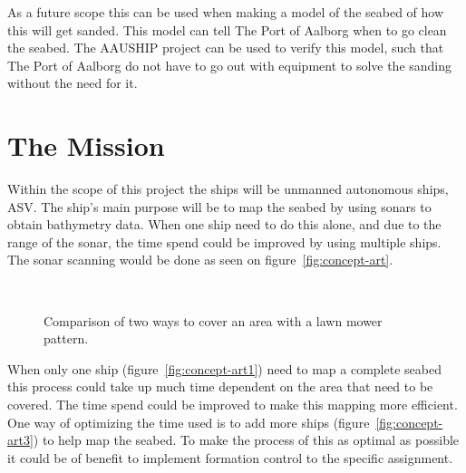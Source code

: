 As a future scope this can be used when making a model of the seabed of how this will get sanded. This model can tell The Port of Aalborg when to go clean the seabed. The AAUSHIP project can be used to verify this model, such that The Port of Aalborg do not have to go out with equipment to solve the sanding without the need for it.

\section{The Mission}
\label{sc:mission}
Within the scope of this project the ships will be unmanned autonomous ships,
\ac{ASV}. The ship's main purpose will be to map the seabed by using
sonars to obtain bathymetry data. When one ship need to do this alone, and due to the range of
the sonar, the time spend could be improved by using multiple ships. The sonar scanning would
be done as seen on figure~\vref{fig:concept-art}.


\begin{figure}[htbp]
	\centering
	\ %
	\caption{Comparison of two ways to cover an area with a lawn mower
	pattern.}
	\label{fig:concept-art}
\end{figure}


When only one ship (figure~\vref{fig:concept-art1}) need to map a complete seabed this process could
take up much time dependent on the area that need to be covered. The
time spend could be improved to make this mapping more efficient. One
way of optimizing the time used is to add more ships (figure~\vref{fig:concept-art3}) to help map the
seabed. To make the process of this as optimal as possible it could be
of benefit to implement formation control to the specific assignment.


